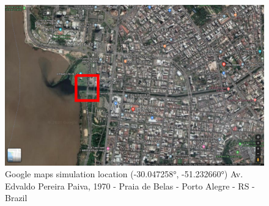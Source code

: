     \begin{figure}[H]
        \centering
        \includegraphics[scale=0.3]{figs/simulation_diluvio_googleLocation_roundedArea.png}
        \caption{Google maps simulation location (-30.047258°, -51.232660°) Av. Edvaldo Pereira Paiva, 1970 - Praia de Belas - Porto Alegre - RS - Brazil}
        \label{fig:simulation_diluvio_googleLocation_roundedArea}
    \end{figure}
    
